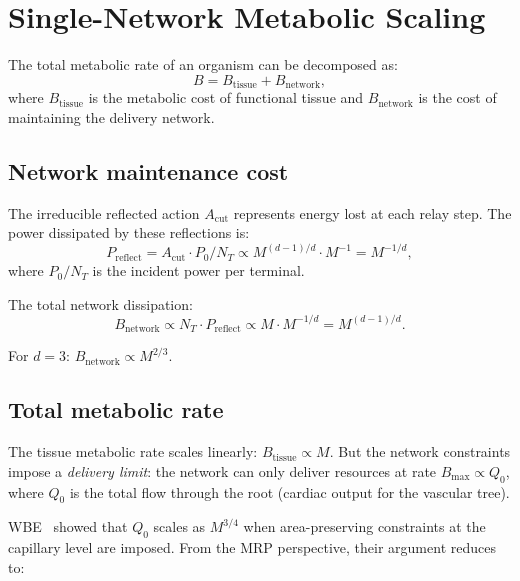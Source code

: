 \documentclass[aps,pre,twocolumn,superscriptaddress,longbibliography]{revtex4-2}
\newcommand{\Acut}{A_{\text{cut}}}
\begin{document}
\section{Single-Network Metabolic Scaling}
\label{sec:single-scaling}

The total metabolic rate of an organism can be decomposed as:
\begin{equation}
  B = B_{\text{tissue}} + B_{\text{network}},
  \label{eq:B-decomp}
\end{equation}
where $B_{\text{tissue}}$ is the metabolic cost of
functional tissue and $B_{\text{network}}$ is the cost
of maintaining the delivery network.

\subsection{Network maintenance cost}

The irreducible reflected action $\Acut$ represents
energy lost at each relay step.
The power dissipated by these reflections is:
\begin{equation}
  P_{\text{reflect}} = \Acut \cdot P_0 / N_T
    \propto M^{(d-1)/d} \cdot M^{-1} = M^{-1/d},
  \label{eq:P-reflect}
\end{equation}
where $P_0 / N_T$ is the incident power per terminal.

The total network dissipation:
\begin{equation}
  B_{\text{network}} \propto N_T \cdot P_{\text{reflect}}
    \propto M \cdot M^{-1/d} = M^{(d-1)/d}.
  \label{eq:B-network}
\end{equation}

For $d = 3$: $B_{\text{network}} \propto M^{2/3}$.

\subsection{Total metabolic rate}

The tissue metabolic rate scales linearly:
$B_{\text{tissue}} \propto M$.
But the network constraints impose a \emph{delivery limit}:
the network can only deliver resources at rate
$B_{\text{max}} \propto Q_0$, where $Q_0$ is the total
flow through the root (cardiac output for the vascular
tree).

WBE~\cite{WBE1997} showed that $Q_0$ scales as $M^{3/4}$
when area-preserving constraints at the capillary level
are imposed.
From the MRP perspective, their argument reduces to:
\end{document}
